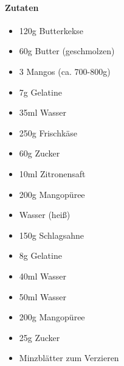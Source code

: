 \newpage
{}

\paragraph{Zutaten}
\begin{itemize}[noitemsep]
	\item 120g Butterkekse
	\item 60g Butter (geschmolzen)
	\item 3 Mangos (ca. 700-800g)
	\item 7g Gelatine
	\item 35ml Wasser
	\item 250g Frischkäse
	\item 60g Zucker
	\item 10ml Zitronensaft
	\item 200g Mangopüree
	\item Wasser (heiß)
	\item 150g Schlagsahne
	\item 8g Gelatine
	\item 40ml Wasser
	\item 50ml Wasser 
	\item 200g Mangopüree
	\item 25g Zucker
	\item Minzblätter zum Verzieren
\end{itemize}

